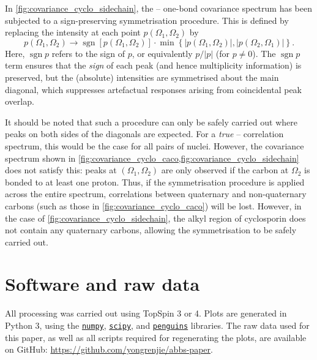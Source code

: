 \documentclass[a4paper,12pt]{article}
\DeclareMathOperator*{\sgn}{sgn}
\newcommand{\carbon}{\ch{^{13}C}}
\begin{document}
\begin{refsection}
In \cref{fig:covariance_cyclo_sidechain}, the \carbon{}--\carbon{} one-bond covariance spectrum has been subjected to a sign-preserving symmetrisation procedure.
This is defined by replacing the intensity at each point $p(\Omega_1, \Omega_2)$ by
\begin{equation}
    \label{eq:covariance_symmetrisation}
    p(\Omega_1, \Omega_2) \to \sgn[p(\Omega_1, \Omega_2)] \cdot \min\left\{|p(\Omega_1, \Omega_2)|, |p(\Omega_2, \Omega_1)|\right\}.
\end{equation}
Here, $\sgn{p}$ refers to the sign of $p$, or equivalently $p / |p|$ (for $p \neq 0$).
The $\sgn{p}$ term ensures that the \textit{sign} of each peak (and hence multiplicity information) is preserved, but the (absolute) intensities are symmetrised about the main diagonal, which suppresses artefactual responses arising from coincidental peak overlap.

It should be noted that such a procedure can only be safely carried out where peaks on both sides of the diagonals are expected.
For a \textit{true} \carbon{}--\carbon{} correlation spectrum, this would be the case for all pairs of \carbon{} nuclei.
However, the covariance spectrum shown in \cref{fig:covariance_cyclo_caco,fig:covariance_cyclo_sidechain} does not satisfy this: peaks at $(\Omega_1, \Omega_2)$ are only observed if the carbon at $\Omega_2$ is bonded to at least one proton.
Thus, if the symmetrisation procedure is applied across the entire spectrum, correlations between quaternary and non-quaternary carbons (such as those in \cref{fig:covariance_cyclo_caco}) will be lost.
However, in the case of \cref{fig:covariance_cyclo_sidechain}, the alkyl region of cyclosporin does not contain any quaternary carbons, allowing the symmetrisation to be safely carried out.


\clearpage

\section{Software and raw data}

All processing was carried out using TopSpin 3 or 4.
Plots are generated in Python 3, using the \href{https://github.com/numpy/numpy}{\texttt{numpy}}, \href{https://github.com/scipy/scipy}{\texttt{scipy}}, and \href{https://github.com/yongrenjie/penguins}{\texttt{penguins}} libraries.
The raw data used for this paper, as well as all scripts required for regenerating the plots, are available on GitHub: \url{https://github.com/yongrenjie/abbs-paper}.


\end{refsection}
\end{document}

